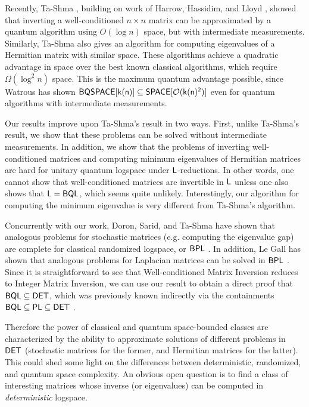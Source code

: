 \documentclass[11pt]{article}
\newcommand{\classfont}{\sf}
\numberwithin{lemma}{section}
\theoremstyle{definition}
\newcommand\BQSPACE{\sf{BQSPACE}}
\newcommand\DET{{\sf{DET}}}
\newcommand\Logspace{{\sf{L}}}
\newcommand\DSPACE{{\sf{SPACE}}}
\newcommand\bigoh{\mathcal{O}}
\newcommand\PLclass{{\sf{PL}}}
\newcommand{\BPL}{{\classfont{BPL}}}
\newcommand{\unitaryBQL}{{\classfont{BQL}}}
\begin{document}
Recently, Ta-Shma \cite{tashma}, building on work of Harrow, Hassidim, and Lloyd \cite{HHL}, showed that inverting a well-conditioned $n \times n$ matrix can be approximated by a quantum algorithm using $O(\log n)$ space, but with intermediate measurements. Similarly, Ta-Shma also gives an algorithm for computing eigenvalues of a Hermitian matrix with similar space. These algorithms achieve a quadratic advantage in space over the best known classical algorithms, which require $\Omega(\log^2n)$ space.  This is the maximum quantum advantage possible, since Watrous has shown $\BQSPACE[k(n)]\subseteq\DSPACE[\bigoh(k(n)^2)]$ \cite{Watrous99,Watrous03} even for quantum algorithms with intermediate measurements.

Our results improve upon Ta-Shma's result \cite{tashma} in two ways. First, unlike Ta-Shma's result, we show that these problems can be solved without intermediate measurements.  In addition, we show that the problems of inverting well-conditioned matrices and computing minimum eigenvalues of Hermitian matrices are hard for unitary quantum logspace under $\Logspace$-reductions. In other words, one cannot show that well-conditioned matrices are invertible in $\Logspace$ unless one also shows that $\Logspace=\unitaryBQL$, which seems quite unlikely. Interestingly, our algorithm for computing the minimum eigenvalue is very different from Ta-Shma's algorithm.

Concurrently with our work, Doron, Sarid, and Ta-Shma have shown that analogous problems for stochastic matrices (e.g. computing the eigenvalue gap) are complete for classical randomized logspace, or $\BPL$ \cite{dt15,dst16}. In addition, Le Gall has shown that analogous problems for Laplacian matrices can be solved in $\BPL$ \cite{legall16}. Since it is straightforward to see that Well-conditioned Matrix Inversion reduces to Integer Matrix Inversion, we can use our result to obtain a direct proof that $\unitaryBQL\subseteq\DET$, which was previously known indirectly via the containments $\unitaryBQL\subseteq\PLclass\subseteq\DET$ \cite{Watrous03,Borodin84}.

Therefore the power of classical and quantum space-bounded classes are characterized by the ability to approximate solutions of different problems in $\DET$ (stochastic matrices for the former, and Hermitian matrices for the latter). This could shed some light on the differences between deterministic, randomized, and quantum space complexity. An obvious open question is to find a class of interesting matrices whose inverse (or eigenvalues) can be computed in \emph{deterministic} logspace.
\end{document}
